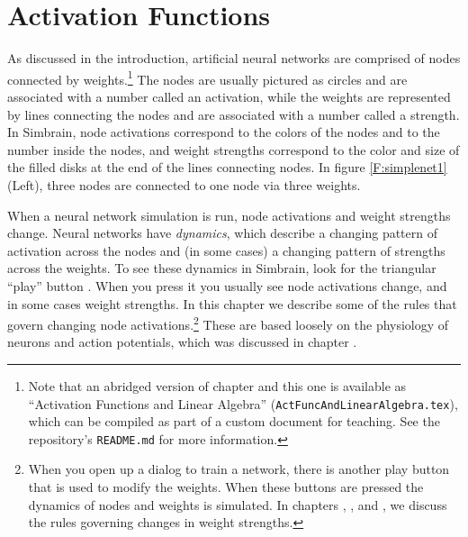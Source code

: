 \chapter{Activation Functions}\label{ch_act_functions}


 As discussed in the introduction, artificial neural networks are comprised of nodes connected by weights.\footnote{Note that an abridged version of chapter  and this one is available as ``Activation Functions and Linear Algebra'' (\texttt{ActFuncAndLinearAlgebra.tex}), which can be compiled as part of a custom document for teaching. See the repository's \texttt{README.md} for more information.} The nodes are usually pictured as circles and are associated with a number called an activation, while the weights are represented by lines connecting the nodes and are associated with a number called a strength. In Simbrain, node activations correspond to the colors of the nodes and to the number inside the nodes, and weight strengths correspond to the color and size of the filled disks at the end of the lines connecting nodes. In figure \ref{F:simplenet1} (Left), three nodes are connected to one node via three weights.

When a neural network simulation is run, node activations and weight strengths change. Neural networks have \emph{dynamics}, which describe a changing pattern of activation across the nodes and (in some cases) a changing pattern of strengths across the weights. To see these dynamics in Simbrain, look for the triangular ``play''  button . When you press it you usually see node activations change, and in some cases weight strengths. In this chapter we describe some of the rules that govern changing node activations.\footnote{When you open up a dialog to train a network, there is another play button that is used to modify the weights. When these buttons are pressed the dynamics of nodes and weights is simulated. In chapters , , and , we discuss the rules governing changes in weight strengths.} These are based loosely on the physiology of neurons and action potentials, which was discussed in chapter .

